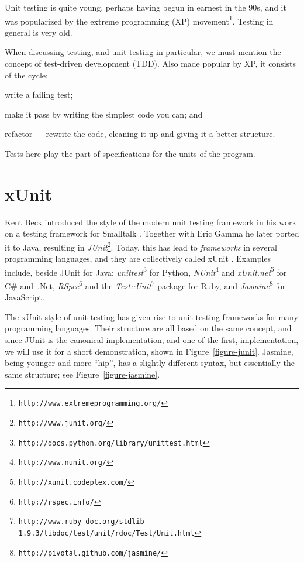 \documentclass[a4paper,11pt]{kth-mag}
\theoremstyle{definition}
\begin{document}
Unit testing is quite young, perhaps having begun in earnest in the 90s, and it
was popularized by the extreme programming (XP)
movement\footnote{\texttt{http://www.extremeprogramming.org/}}. Testing in
general is very old.

When discussing testing, and unit testing in particular, we must mention the
concept of test-driven development (TDD). Also made popular by XP, it consists
of the cycle:
\begin{inparaenum}[1\upshape)]
  \item write a failing test;
  \item make it pass by writing the simplest code you can; and
  \item refactor --- rewrite the code, cleaning it up and giving it a better
    structure.
\end{inparaenum}
Tests here play the part of specifications for the units of the program.


\section{xUnit} \label{section-xunit}

Kent Beck introduced the style of the modern unit testing framework in his work
on a testing framework for Smalltalk \cite{becksmalltalktesting}. Together
with Eric Gamma he later ported it to Java, resulting in
\textit{JUnit}\footnote{\texttt{http://www.junit.org/}}.
Today, this has lead to \textit{frameworks} in several programming languages,
and they are collectively called xUnit \cite{fowlerxunit}. Examples include,
beside JUnit for Java:
\textit{unittest}\footnote{\texttt{http://docs.python.org/library/unittest.html}}
for Python,
\textit{NUnit}\footnote{\texttt{http://www.nunit.org/}} and
\textit{xUnit.net}\footnote{\texttt{http://xunit.codeplex.com/}} for C\#
and~.Net,
\textit{RSpec}\footnote{\texttt{http://rspec.info/}} and the
\textit{Test::Unit}\footnote{\texttt{http://www.ruby-doc.org/stdlib-1.9.3/libdoc/test/unit/rdoc/Test/Unit.html}}
package for Ruby,
and \textit{Jasmine}\footnote{\texttt{http://pivotal.github.com/jasmine/}} for
JavaScript.

The xUnit style of unit testing \cite{fowlerxunit} has given rise to unit
testing frameworks for many programming languages. Their structure are all
based on the same concept, and since JUnit is the canonical implementation, and
one of the first, implementation, we will use it for a short demonstration,
shown in Figure~\ref{figure-junit}. Jasmine, being younger and more ``hip'',
has a slightly different syntax, but essentially the same structure; see
Figure~\ref{figure-jasmine}.
\end{document}
